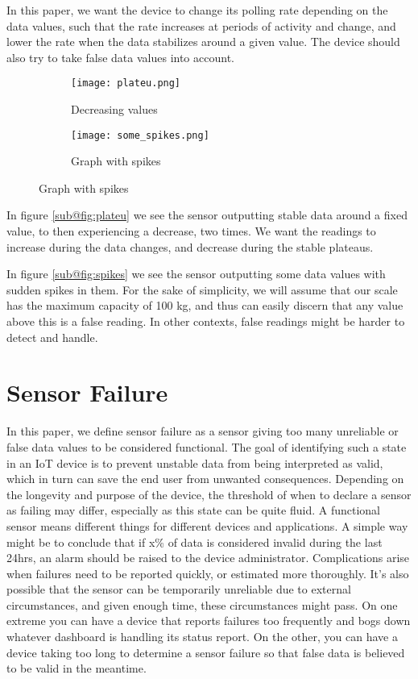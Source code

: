 In this paper, we want the device to change its polling rate depending on the data values, such that the rate increases at periods of activity and change, and lower the rate when the data stabilizes around a given value. The device should also try to take false data values into account.

\begin{figure}[H]
\centering
	\begin{subfigure}[b]{0.3\textwidth}
    \texttt{[image: plateu.png]}
    \caption{Decreasing values}
    \label{fig:plateu}
	\end{subfigure}
	\begin{subfigure}[b]{0.3\textwidth}
    \texttt{[image: some\_spikes.png]}
    \caption{Graph with spikes}
    \label{fig:spikes}
	\end{subfigure}
\end{figure}
In figure \ref{sub@fig:plateu} we see the sensor outputting stable data around a fixed value, to then experiencing a decrease, two times. We want the readings to increase during the data changes, and decrease during the stable plateaus.

In figure \ref{sub@fig:spikes} we see the sensor outputting some data values with sudden spikes in them. For the sake of simplicity, we will assume that our scale has the maximum capacity of 100 kg, and thus can easily discern that any value above this is a false reading. In other contexts, false readings might be harder to detect and handle.

\section{Sensor Failure}
In this paper, we define sensor failure as a sensor giving too many unreliable or false data values to be considered functional. The goal of identifying such a state in an IoT device is to prevent unstable data from being interpreted as valid, which in turn can save the end user from unwanted consequences. Depending on the longevity and purpose of the device, the threshold of when to declare a sensor as failing may differ, especially as this state can be quite fluid. A functional sensor means different things for different devices and applications. A simple way might be to conclude that if x\% of data is considered invalid during the last 24hrs, an alarm should be raised to the device administrator. Complications arise when failures need to be reported quickly, or estimated more thoroughly. It's also possible that the sensor can be temporarily unreliable due to external circumstances, and given enough time, these circumstances might pass. On one extreme you can have a device that reports failures too frequently and bogs down whatever dashboard is handling its status report. On the other, you can have a device taking too long to determine a sensor failure so that false data is believed to be valid in the meantime.

